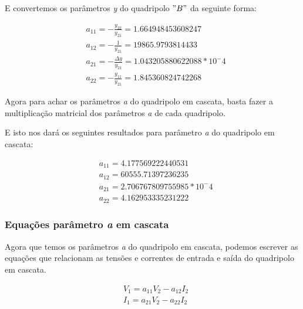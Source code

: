 \documentclass[12pt,twoside, a4paper, twocolumn]{article}
\begin{document}
E convertemos os parâmetros \emph{y} do quadripolo $"B"$ da seguinte forma:


\begin{equation}
    \begin{aligned}
         & a_{11} = -\frac{y_{22}}{y_{21}} = 1.664948453608247              \\
         & a_{12} = -\frac{1}{y_{21}} = 19865.9793814433                    \\
         & a_{21} = -\frac{\varDelta y}{y_{21}} = 1.043205880622088 * 10^-4 \\
         & a_{22} = -\frac{y_{11}}{y_{21}} = 1.845360824742268
    \end{aligned}
\end{equation}


Agora para achar os parâmetros \emph{a} do quadripolo em cascata, basta fazer a multiplicação matricial dos parâmetros \emph{a} de cada quadripolo.


E isto nos dará os seguintes resultados para parâmetro \emph{a} do quadripolo em cascata:


\begin{equation}
    \begin{aligned}
         & a_{11} = 4.177569222440531       \\
         & a_{12} = 60555.71397236235       \\
         & a_{21} = 2.706767809755985*10^-4 \\
         & a_{22} = 4.162953335231222
    \end{aligned}
\end{equation}


\subsubsection{Equações parâmetro \emph{a} em cascata}


Agora que temos os parâmetros \emph{a} do quadripolo em cascata, podemos escrever as equações que relacionam as tensões e correntes de entrada e saída do quadripolo em cascata.


\begin{equation}
    \begin{aligned}
         & V_1 = a_{11} V_2 - a_{12} I_2 \\
         & I_1 = a_{21} V_2 - a_{22} I_2 \\
    \end{aligned}
\end{equation}
\end{document}

